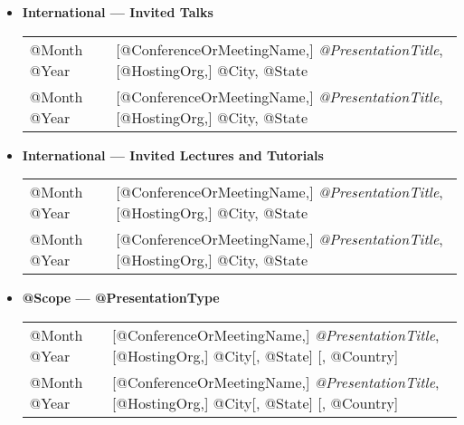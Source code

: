 \documentclass[10pt]{article}
\begin{document}
\begin{itemize}
\item[] \textbf{International --- Invited Talks}
\\[1.3ex]
\begin{tabular}{l@{\quad\ }p{34em}} 
 @Month @Year 
 & [@ConferenceOrMeetingName,] \emph{@PresentationTitle},
   [@HostingOrg,]
   @City, @State
   \smallskip \\
 @Month @Year 
 & [@ConferenceOrMeetingName,] \emph{@PresentationTitle},
   [@HostingOrg,]
   @City, @State
\end{tabular}

\item[] \textbf{International --- Invited Lectures and Tutorials}
\\[1.3ex]
\begin{tabular}{l@{\quad\ }p{34em}} 
 @Month @Year 
 & [@ConferenceOrMeetingName,] \emph{@PresentationTitle},
   [@HostingOrg,]
   @City, @State
   \smallskip \\
 @Month @Year 
 & [@ConferenceOrMeetingName,] \emph{@PresentationTitle},
   [@HostingOrg,]
   @City, @State
\end{tabular}

%
\item[] \textbf{@Scope --- @PresentationType}
\\[1.3ex]
\begin{tabular}{l@{\quad\ }p{34em}} 
 @Month @Year 
 & [@ConferenceOrMeetingName,] \emph{@PresentationTitle},
   [@HostingOrg,]
   @City[, @State] [, @Country]
   \smallskip \\
 @Month @Year 
 & [@ConferenceOrMeetingName,] \emph{@PresentationTitle},
   [@HostingOrg,]
   @City[, @State] [, @Country]
   \smallskip \\
\end{tabular}
\end{itemize}


\section*{\service}

\end{document}
